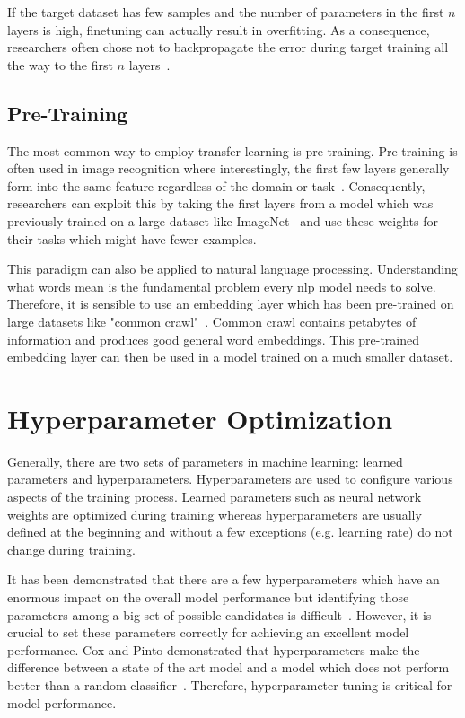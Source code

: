 If the target dataset has few samples and the number of parameters in the first $n$ layers is high, finetuning can actually result in overfitting. As a consequence, researchers often chose not to backpropagate the error during target training all the way to the first $n$ layers~\cite{Yosinski2014}.

\subsection*{Pre-Training}
The most common way to employ transfer learning is pre-training. 
Pre-training is often used in image recognition where interestingly, the first few layers generally form into the same feature regardless of the domain or task~\cite{Yosinski2014}. Consequently, researchers can exploit this by taking the first layers from a model which was previously trained on a large dataset like ImageNet~\cite{Russakovsky2015} and use these weights for their tasks which might have fewer examples.
\medskip

This paradigm can also be applied to natural language processing. Understanding what words mean is the fundamental problem every \gls{nlp} model needs to solve. Therefore, it is sensible to use an embedding layer which has been pre-trained on large datasets like "common crawl"~\cite{commonCrawl}. Common crawl contains petabytes of information and produces good general word embeddings. This pre-trained embedding layer can then be used in a model trained on a much smaller dataset.
 
\section{Hyperparameter Optimization}

Generally, there are two sets of parameters in machine learning: learned parameters and hyperparameters. Hyperparameters are used to configure various aspects of the training process. Learned parameters such as neural network weights are optimized during training whereas hyperparameters are usually defined at the beginning and without a few exceptions {(e.g. learning rate)} do not change during training.
\medskip

It has been demonstrated that there are a few hyperparameters which have an enormous impact on the overall model performance but identifying those parameters among a big set of possible candidates is difficult~\cite{Bergstra2012a}. However, it is crucial to set these parameters correctly for achieving an excellent model performance. Cox and Pinto demonstrated that hyperparameters make the difference between a state of the art model and a model which does not perform better than a random classifier~\cite{Cox2011}. Therefore, hyperparameter tuning is critical for model performance.
\medskip

